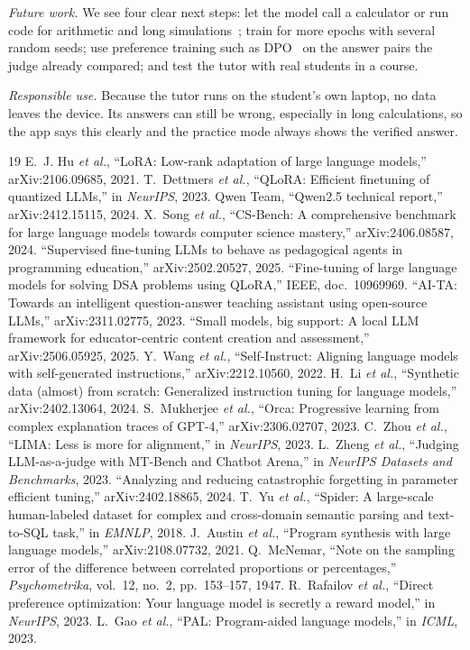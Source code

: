 \documentclass[conference]{IEEEtran}
\begin{document}
\emph{Future work.} We see four clear next steps: let the model call a calculator or run code for arithmetic and long simulations~\cite{pal}; train for more epochs with several random seeds; use preference training such as DPO~\cite{dpo} on the answer pairs the judge already compared; and test the tutor with real students in a course.

\emph{Responsible use.} Because the tutor runs on the student's own laptop, no data leaves the device. Its answers can still be wrong, especially in long calculations, so the app says this clearly and the practice mode always shows the verified answer.

\begin{thebibliography}{19}
 E.~J. Hu \emph{et al.}, ``LoRA: Low-rank adaptation of large language models,'' arXiv:2106.09685, 2021.
 T.~Dettmers \emph{et al.}, ``QLoRA: Efficient finetuning of quantized LLMs,'' in \emph{NeurIPS}, 2023.
 Qwen Team, ``Qwen2.5 technical report,'' arXiv:2412.15115, 2024.
 X.~Song \emph{et al.}, ``CS-Bench: A comprehensive benchmark for large language models towards computer science mastery,'' arXiv:2406.08587, 2024.
 ``Supervised fine-tuning LLMs to behave as pedagogical agents in programming education,'' arXiv:2502.20527, 2025.
 ``Fine-tuning of large language models for solving DSA problems using QLoRA,'' IEEE, doc.~10969969.
 ``AI-TA: Towards an intelligent question-answer teaching assistant using open-source LLMs,'' arXiv:2311.02775, 2023.
 ``Small models, big support: A local LLM framework for educator-centric content creation and assessment,'' arXiv:2506.05925, 2025.
 Y.~Wang \emph{et al.}, ``Self-Instruct: Aligning language models with self-generated instructions,'' arXiv:2212.10560, 2022.
 H.~Li \emph{et al.}, ``Synthetic data (almost) from scratch: Generalized instruction tuning for language models,'' arXiv:2402.13064, 2024.
 S.~Mukherjee \emph{et al.}, ``Orca: Progressive learning from complex explanation traces of GPT-4,'' arXiv:2306.02707, 2023.
 C.~Zhou \emph{et al.}, ``LIMA: Less is more for alignment,'' in \emph{NeurIPS}, 2023.
 L.~Zheng \emph{et al.}, ``Judging LLM-as-a-judge with MT-Bench and Chatbot Arena,'' in \emph{NeurIPS Datasets and Benchmarks}, 2023.
 ``Analyzing and reducing catastrophic forgetting in parameter efficient tuning,'' arXiv:2402.18865, 2024.
 T.~Yu \emph{et al.}, ``Spider: A large-scale human-labeled dataset for complex and cross-domain semantic parsing and text-to-SQL task,'' in \emph{EMNLP}, 2018.
 J.~Austin \emph{et al.}, ``Program synthesis with large language models,'' arXiv:2108.07732, 2021.
 Q.~McNemar, ``Note on the sampling error of the difference between correlated proportions or percentages,'' \emph{Psychometrika}, vol.~12, no.~2, pp.~153--157, 1947.
 R.~Rafailov \emph{et al.}, ``Direct preference optimization: Your language model is secretly a reward model,'' in \emph{NeurIPS}, 2023.
 L.~Gao \emph{et al.}, ``PAL: Program-aided language models,'' in \emph{ICML}, 2023.
\end{thebibliography}
\end{document}
